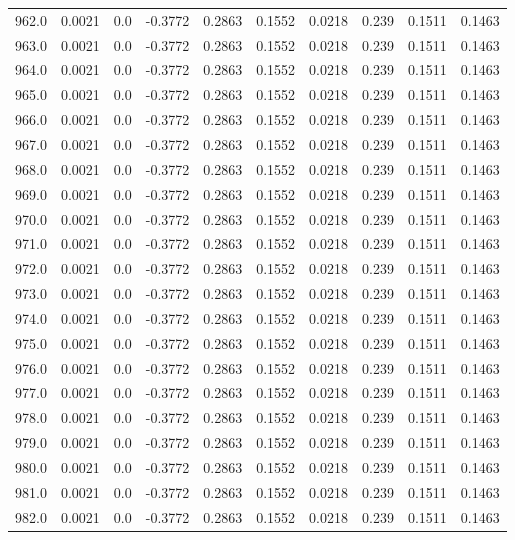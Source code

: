 \begin{longtable}{lrrrrrrrrr}
962.0 & 0.0021 & 0.0 & -0.3772 & 0.2863 & 0.1552 & 0.0218 & 0.239 & 0.1511 & 0.1463 \\
963.0 & 0.0021 & 0.0 & -0.3772 & 0.2863 & 0.1552 & 0.0218 & 0.239 & 0.1511 & 0.1463 \\
964.0 & 0.0021 & 0.0 & -0.3772 & 0.2863 & 0.1552 & 0.0218 & 0.239 & 0.1511 & 0.1463 \\
965.0 & 0.0021 & 0.0 & -0.3772 & 0.2863 & 0.1552 & 0.0218 & 0.239 & 0.1511 & 0.1463 \\
966.0 & 0.0021 & 0.0 & -0.3772 & 0.2863 & 0.1552 & 0.0218 & 0.239 & 0.1511 & 0.1463 \\
967.0 & 0.0021 & 0.0 & -0.3772 & 0.2863 & 0.1552 & 0.0218 & 0.239 & 0.1511 & 0.1463 \\
968.0 & 0.0021 & 0.0 & -0.3772 & 0.2863 & 0.1552 & 0.0218 & 0.239 & 0.1511 & 0.1463 \\
969.0 & 0.0021 & 0.0 & -0.3772 & 0.2863 & 0.1552 & 0.0218 & 0.239 & 0.1511 & 0.1463 \\
970.0 & 0.0021 & 0.0 & -0.3772 & 0.2863 & 0.1552 & 0.0218 & 0.239 & 0.1511 & 0.1463 \\
971.0 & 0.0021 & 0.0 & -0.3772 & 0.2863 & 0.1552 & 0.0218 & 0.239 & 0.1511 & 0.1463 \\
972.0 & 0.0021 & 0.0 & -0.3772 & 0.2863 & 0.1552 & 0.0218 & 0.239 & 0.1511 & 0.1463 \\
973.0 & 0.0021 & 0.0 & -0.3772 & 0.2863 & 0.1552 & 0.0218 & 0.239 & 0.1511 & 0.1463 \\
974.0 & 0.0021 & 0.0 & -0.3772 & 0.2863 & 0.1552 & 0.0218 & 0.239 & 0.1511 & 0.1463 \\
975.0 & 0.0021 & 0.0 & -0.3772 & 0.2863 & 0.1552 & 0.0218 & 0.239 & 0.1511 & 0.1463 \\
976.0 & 0.0021 & 0.0 & -0.3772 & 0.2863 & 0.1552 & 0.0218 & 0.239 & 0.1511 & 0.1463 \\
977.0 & 0.0021 & 0.0 & -0.3772 & 0.2863 & 0.1552 & 0.0218 & 0.239 & 0.1511 & 0.1463 \\
978.0 & 0.0021 & 0.0 & -0.3772 & 0.2863 & 0.1552 & 0.0218 & 0.239 & 0.1511 & 0.1463 \\
979.0 & 0.0021 & 0.0 & -0.3772 & 0.2863 & 0.1552 & 0.0218 & 0.239 & 0.1511 & 0.1463 \\
980.0 & 0.0021 & 0.0 & -0.3772 & 0.2863 & 0.1552 & 0.0218 & 0.239 & 0.1511 & 0.1463 \\
981.0 & 0.0021 & 0.0 & -0.3772 & 0.2863 & 0.1552 & 0.0218 & 0.239 & 0.1511 & 0.1463 \\
982.0 & 0.0021 & 0.0 & -0.3772 & 0.2863 & 0.1552 & 0.0218 & 0.239 & 0.1511 & 0.1463 \\

\end{longtable}
